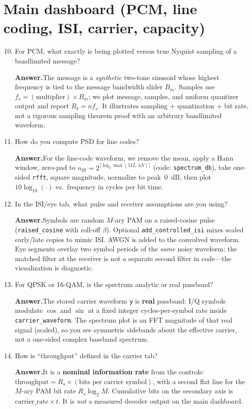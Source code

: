 \documentclass[11pt]{article}
\newenvironment{qaitem}{%
  \begin{enumerate}[label=\textbf{Q\arabic*.}, leftmargin=2.2em, itemsep=1.1em, listparindent=0pt]
}{%
  \end{enumerate}%
}
\newcommand{\Ans}{\par\noindent\textbf{Answer.}\quad}
\begin{document}
\section*{Main dashboard (PCM, line coding, ISI, carrier, capacity)}

\begin{qaitem}
  \setcounter{enumi}{9}
  \item For PCM, what exactly is being plotted versus true Nyquist sampling of a bandlimited message?
  \Ans The message is a \emph{synthetic} two-tone sinusoid whose highest frequency is tied to the message bandwidth slider $B_m$. Samples use $f_s = (\text{multiplier})\times B_m$; we plot message, samples, and uniform quantizer output and report $R_b = n f_s$. It illustrates sampling + quantization + bit rate, not a rigorous sampling theorem proof with an arbitrary bandlimited waveform.

  \item How do you compute PSD for line codes?
  \Ans For the line-code waveform, we remove the mean, apply a Hann window, zero-pad to $n_{\mathrm{fft}} = 2^{\lceil\log_2\max(512,\,4N)\rceil}$ (code: \texttt{spectrum\_db}), take one-sided \texttt{rfft}, square magnitude, normalize to peak~0~dB, then plot $10\log_{10}(\cdot)$ vs.\ frequency in cycles per bit time.

  \item In the ISI/eye tab, what pulse and receiver assumptions are you using?
  \Ans Symbols are random $M$-ary PAM on a raised-cosine pulse (\texttt{raised\_cosine} with roll-off $\beta$). Optional \texttt{add\_controlled\_isi} mixes scaled early/late copies to mimic ISI. AWGN is added to the convolved waveform. Eye segments overlay two symbol periods of the \emph{same} noisy waveform; the matched filter at the receiver is not a separate second filter in code---the visualization is diagnostic.

  \item For QPSK or 16-QAM, is the spectrum analytic or real passband?
  \Ans The stored carrier waveform \texttt{y} is \textbf{real} passband: I/Q symbols modulate $\cos$ and $\sin$ at a fixed integer cycles-per-symbol rate inside \texttt{carrier\_waveform}. The spectrum plot is an FFT magnitude of that real signal (scaled), so you see symmetric sidebands about the effective carrier, not a one-sided complex baseband spectrum.

  \item How is ``throughput'' defined in the carrier tab?
  \Ans It is a \textbf{nominal information rate} from the controls: $\text{throughput} = R_s \times (\text{bits per carrier symbol})$, with a second flat line for the $M$-ary PAM bit rate $R_s \log_2 M$. Cumulative bits on the secondary axis is $\text{carrier\_rate}\times t$. It is \emph{not} a measured decoder output on the main dashboard.


\end{qaitem}
\end{document}
